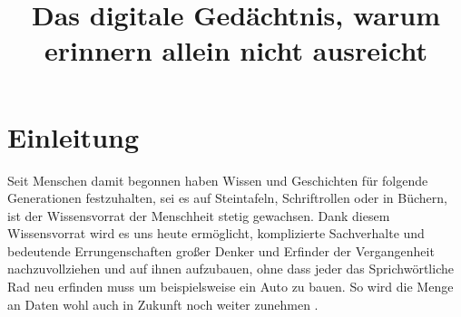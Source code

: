 \documentclass[conference,compsoc,final,a4paper]{IEEEtran}
\newcommand{\autoren}[0]{Nockel, Sascha}
\newcommand{\dokumententitel}[0]{Das digitale Gedächtnis, warum erinnern allein nicht ausreicht}
\begin{document}
\title{\dokumententitel}

\author{
  \IEEEauthorblockN{\autoren}
}

\maketitle
\thispagestyle{plain}
\pagestyle{plain}


\begin{abstract}

\end{abstract}

{\small\tableofcontents}

\section{Einleitung}
Seit Menschen damit begonnen haben Wissen und Geschichten für folgende Generationen festzuhalten, sei es auf Steintafeln, Schriftrollen oder in Büchern, ist der Wissensvorrat der Menschheit stetig gewachsen. Dank diesem Wissensvorrat wird es uns heute ermöglicht, komplizierte Sachverhalte und bedeutende Errungenschaften großer Denker und Erfinder der Vergangenheit nachzuvollziehen und auf ihnen aufzubauen, ohne dass jeder das Sprichwörtliche Rad neu erfinden muss um beispielsweise ein Auto zu bauen. So wird die Menge an Daten wohl auch in Zukunft noch weiter zunehmen \autocite{Reinsel2018}.
\end{document}
